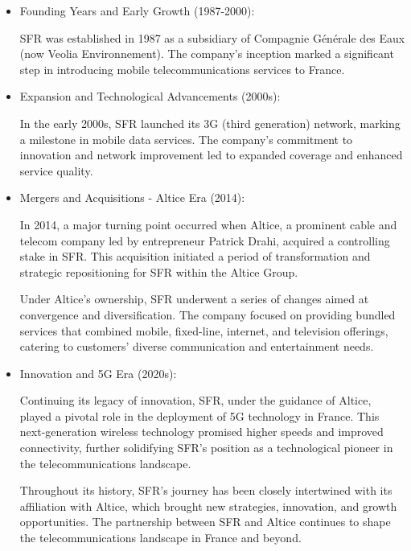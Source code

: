 \begin{itemize}

    \item Founding Years and Early Growth (1987-2000):

SFR was established in 1987 as a subsidiary of Compagnie Générale des Eaux (now Veolia Environnement). The company's inception marked a significant step in introducing mobile telecommunications services to France.

    \item Expansion and Technological Advancements (2000s):

In the early 2000s, SFR launched its 3G (third generation) network, marking a milestone in mobile data services. The company's commitment to innovation and network improvement led to expanded coverage and enhanced service quality.

    \item Mergers and Acquisitions - Altice Era (2014):

In 2014, a major turning point occurred when Altice, a prominent cable and telecom company led by entrepreneur Patrick Drahi, acquired a controlling stake in SFR. This acquisition initiated a period of transformation and strategic repositioning for SFR within the Altice Group.

Under Altice's ownership, SFR underwent a series of changes aimed at convergence and diversification. The company focused on providing bundled services that combined mobile, fixed-line, internet, and television offerings, catering to customers' diverse communication and entertainment needs.

    \item Innovation and 5G Era (2020s):

Continuing its legacy of innovation, SFR, under the guidance of Altice, played a pivotal role in the deployment of 5G technology in France. This next-generation wireless technology promised higher speeds and improved connectivity, further solidifying SFR's position as a technological pioneer in the telecommunications landscape.

Throughout its history, SFR's journey has been closely intertwined with its affiliation with Altice, which brought new strategies, innovation, and growth opportunities. The partnership between SFR and Altice continues to shape the telecommunications landscape in France and beyond.

\end{itemize}

